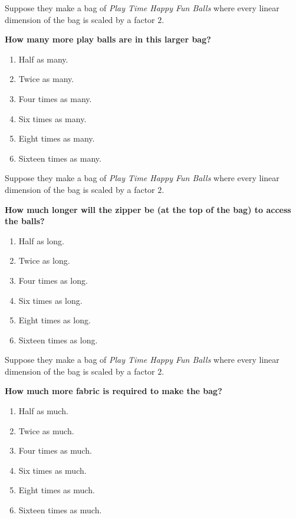 \documentclass[handout,noauthor,nooutcomes]{ximera}
\begin{document}
\begin{exercise}
  Suppose they make a bag of \textit{Play Time Happy Fun Balls} where
  every linear dimension of the bag is scaled by a factor $2$.

  
  \textbf{How many more play balls are in this larger bag?}
  \begin{multicols}{2}
  \begin{enumerate}
  \item Half as many.
  \item Twice as many.
  \item Four times as many.
  \item Six times as many.
  \item Eight times as many.
  \item Sixteen times as many.
  \end{enumerate}
  \end{multicols}
\end{exercise}



\begin{exercise}
 Suppose they make a bag of \textit{Play Time Happy Fun Balls} where
  every linear dimension of the bag is scaled by a factor $2$.

  
  \textbf{How much longer will the zipper be (at the top of the bag)
    to access the balls?}
  \begin{multicols}{2}
  \begin{enumerate}
  \item Half as long.
  \item Twice as long.
  \item Four times as long.
  \item Six times as long.
  \item Eight times as long.
  \item Sixteen times as long.
  \end{enumerate}
  \end{multicols}
\end{exercise}



\begin{exercise}
  Suppose they make a bag of \textit{Play Time Happy Fun Balls} where
  every linear dimension of the bag is scaled by a factor $2$.

  
  \textbf{How much more fabric is required to make the bag?}
  \begin{multicols}{2}
    \begin{enumerate}
    \item Half as much.
    \item Twice as much.
    \item Four times as much.
    \item Six times as much.
    \item Eight times as much.
    \item Sixteen times as much.
    \end{enumerate}
  \end{multicols}
\end{exercise}




\end{document}
